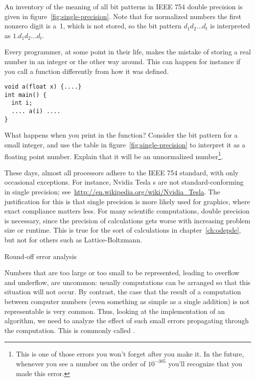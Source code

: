 An inventory of the meaning of all bit patterns in IEEE
754 double precision is given in figure~\ref{fig:single-precision}.
Note that for normalized numbers the first nonzero digit is a~1, which
is not stored, so the bit pattern $d_1d_2\ldots d_t$ is interpreted as
$1.d_1d_2\ldots d_t$.

\begin{exercise}
  Every programmer, at some point in their life, makes the mistake of
  storing a real number in an integer or the other way around. This
  can happen for instance if you call a function differently from how
  it was defined.
\begin{verbatim}
void a(float x) {....}
int main() {
  int i;
  .... a(i) ....
}
\end{verbatim}
What happens when you print  in the function? Consider the bit
pattern for a small integer, and use the table in
figure~\ref{fig:single-precision} to interpret it as a floating point
number. Explain that it will be an unnormalized number\footnote{This
  is one of those errors you won't forget after you make it. In the
  future, whenever you see a number on the order of $10^{-305}$ you'll
  recognize that you made this error.}.
\end{exercise}

These days, almost all processors adhere to the IEEE 754 standard,
with only occasional exceptions. For instance, Nvidia Tesla
s are not standard-conforming in single precision;
see~\url{http://en.wikipedia.org/wiki/Nvidia_Tesla}. The justification
for this is that single precision is more likely used for graphics,
where exact compliance matters less. For many scientific computations,
double precision is necessary, since the precision of calculations
gets worse with increasing problem size or runtime. This is true for
the sort of calculations in chapter~\ref{ch:odepde}, but not for
others such as Lattice-Boltzmann.

 {Round-off error analysis}

Numbers that are too large or too small to be represented, leading to
overflow and underflow, are
uncommon: usually computations can be arranged so that this situation
will not occur. By contrast, the case that the result of a computation
between computer numbers
(even something as simple as a single addition) 
is not representable is very common. Thus, looking at the
implementation of an algorithm, we need to analyze the
effect of such small errors propagating through the computation.
This is commonly called
.

